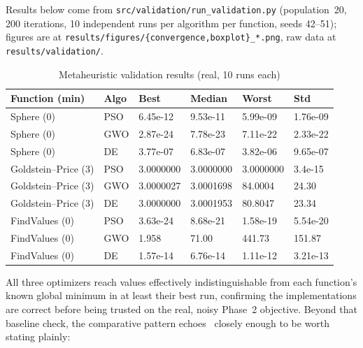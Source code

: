 \documentclass[journal]{IEEEtran}
\begin{document}
Results below come from \texttt{src/validation/run\_validation.py} (population~20, 200 iterations, 10 independent runs per algorithm per function, seeds 42--51); figures are at \texttt{results/figures/\{convergence,boxplot\}\_*.png}, raw data at \texttt{results/validation/}.

\begin{table}[t]
\caption{Metaheuristic validation results (real, 10 runs each)}
\label{tab:validation-results}
\centering
\footnotesize
\begin{tabular}{@{}llllll@{}}
\toprule
Function (min) & Algo & Best & Median & Worst & Std \\
\midrule
Sphere (0) & PSO & 6.45e-12 & 9.53e-11 & 5.99e-09 & 1.76e-09 \\
Sphere (0) & GWO & 2.87e-24 & 7.78e-23 & 7.11e-22 & 2.33e-22 \\
Sphere (0) & DE  & 3.77e-07 & 6.83e-07 & 3.82e-06 & 9.65e-07 \\
Goldstein--Price (3) & PSO & 3.0000000 & 3.0000000 & 3.0000000 & 3.4e-15 \\
Goldstein--Price (3) & GWO & 3.0000027 & 3.0001698 & 84.0004 & 24.30 \\
Goldstein--Price (3) & DE  & 3.0000000 & 3.0001953 & 80.8047 & 23.34 \\
FindValues (0) & PSO & 3.63e-24 & 8.68e-21 & 1.58e-19 & 5.54e-20 \\
FindValues (0) & GWO & 1.958 & 71.00 & 441.73 & 151.87 \\
FindValues (0) & DE  & 1.57e-14 & 6.76e-14 & 1.11e-12 & 3.21e-13 \\
\bottomrule
\end{tabular}
\end{table}

All three optimizers reach values effectively indistinguishable from each function's known global minimum in at least their best run, confirming the implementations are correct before being trusted on the real, noisy Phase~2 objective. Beyond that baseline check, the comparative pattern echoes~\cite{ref11} closely enough to be worth stating plainly:
\end{document}
